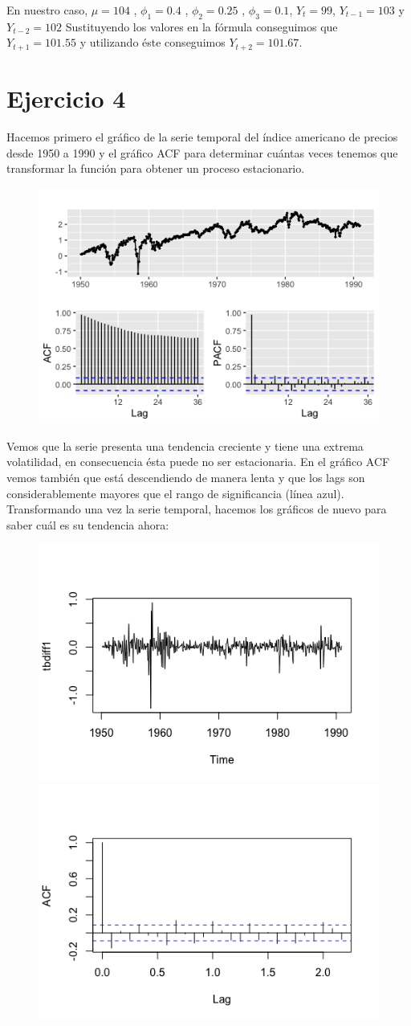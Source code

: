 \documentclass[a4paper,]{article}
\begin{document}
 En nuestro caso, $\mu=104 $ , $\phi_{1} =0.4 $ , $\phi_{2}=0.25 $ , $\phi_{3} =0.1$, $Y_{t}=99$, $Y_{t-1}=103$ y $Y_{t-2}=102$
 Sustituyendo los valores en la fórmula conseguimos que $Y_{t+1}=101.55$ y utilizando éste conseguimos $Y_{t+2}= 101.67$.\\
 
\section*{Ejercicio 4}
Hacemos primero el gráfico de la serie temporal del índice americano de precios desde 1950 a 1990 y el gráfico ACF para determinar cuántas veces tenemos que transformar la función para obtener un proceso estacionario.

\begin{figure}[H]
    \centering
    \includegraphics[width=0.7\linewidth]{mishkin1.png}
\end{figure}


Vemos que la serie presenta una tendencia creciente y tiene una extrema volatilidad, en consecuencia ésta puede no ser estacionaria. En el gráfico ACF vemos también que está descendiendo de manera lenta y que los lags son considerablemente mayores que el rango de significancia (línea azul). \\

Transformando una vez la serie temporal, hacemos los gráficos de nuevo para saber cuál es su tendencia ahora:

\begin{figure}[H]
    \includegraphics[width=0.5\linewidth]{mishk2.png}
    \includegraphics[width=0.5\linewidth]{mishk3.png}
\end{figure}
\end{document}
